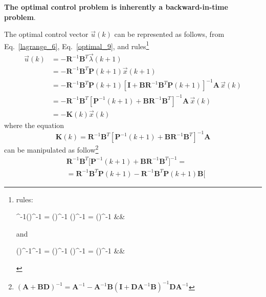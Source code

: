 \documentclass[12pt,a4paper,oneside]{book}
\begin{document}
\begin{onehalfspace}
\noindent\textbf{The optimal control problem is inherently a backward-in-time 
	problem}.

The optimal control vector $\vec{u}(k)$ can be represented as follows, from Eq.~\eqref{lagrange_6}, Eq.~\eqref{optimal_9}, and rules\footnote{rules:
	\begin{flalign}\label{equivalence_1}
		^{-1}\big(\big)^{-1} = \big(\big)^{-1} \quad {} \quad {}\big(\big)^{-1} = \big(\big)^{-1} &&
	\end{flalign}
	and
	\begin{flalign}\label{equivalence_2}
		\big(\big)^{-1}^{-1} = \big(\big)^{-1} \quad {} \quad \big(\big)^{-1} = \big(\big)^{-1} &&
	\end{flalign}
}
\begin{equation}\label{optimal_13}
	\begin{aligned}
		\vec{u}(k) &= -\mathbf{R}^{-1}\mathbf{B}^T\vec{\lambda}(k+1) \\[6pt]
		&=-\mathbf{R}^{-1}\mathbf{B}^T\mathbf{P}(k+1)\vec{x}(k+1)\\[6pt]
		&=-\mathbf{R}^{-1}\mathbf{B}^T\mathbf{P}(k+1)\left[\mathbf{I}+ 
		\mathbf{B}\mathbf{R}^{-1}\mathbf{B}^T\mathbf{P}(k+1)\right]^{-1}\mathbf{A}\,\vec{x}(k)
		\\[6pt]
		&= 
		-\mathbf{R}^{-1}\mathbf{B}^T\left[\mathbf{P}^{-1}(k+1)+\mathbf{B}\mathbf{R}^{-1}\mathbf{B}^T
		\right]^{-1}\mathbf{A}\,\vec{x}(k)\\[6pt]
		&=-\mathbf{K}(k)\vec{x}(k) 
	\end{aligned}
\end{equation}
where the equation
\begin{equation}\label{optimal_14}
	\mathbf{K}(k)= 
	\mathbf{R}^{-1}\mathbf{B}^T\left[\mathbf{P}^{-1}(k+1)+\mathbf{B}\mathbf{R}^{-1}\mathbf{B}^T
	\right]^{-1}\mathbf{A}
\end{equation}
can be manipulated as follow\footnote{$(\mathbf{A}+\mathbf{BD})^{-1} = 
	\mathbf{A}^{-1}-\mathbf{A}^{-1}\mathbf{B}(\mathbf{I}+\mathbf{D}\mathbf{A}^{-1}\mathbf{B})^{-1}\mathbf{D}\mathbf{A}^{-1}$}
\begin{equation}\label{optimal_15}
	\begin{aligned}
		&\mathbf{R}^{-1}\mathbf{B}^T\Big[\mathbf{P}^{-1}(k+1)+\mathbf{B}\mathbf{R}^{-1}\mathbf{B}^T
		\Big]^{-1} = \\[6pt]
		&=\mathbf{R}^{-1}\mathbf{B}^T\mathbf{P}(k+1) - 
		\mathbf{R}^{-1}\mathbf{B}^T\mathbf{P}(k+1)\mathbf{B}\Big[ 

\end{aligned}
\end{equation}
\end{onehalfspace}
\end{document}
